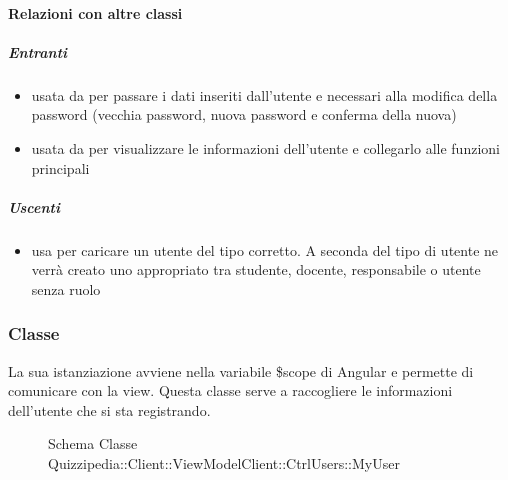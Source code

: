 \paragraph{Relazioni con altre classi}
\subparagraph{Entranti}
\begin{itemize}
\item usata da  per passare i dati inseriti dall'utente e necessari alla modifica della password (vecchia password, nuova password e conferma della nuova)
\item usata da  per visualizzare le informazioni dell'utente e collegarlo alle funzioni principali
\end{itemize}
\subparagraph{Uscenti}
\begin{itemize}
\item usa  per caricare un utente del tipo corretto. A seconda del tipo di utente ne verrà creato uno appropriato tra studente, docente, responsabile o utente senza ruolo
\end{itemize}
\subsubsection{Classe }
La sua istanziazione avviene nella variabile \$scope di Angular e permette di comunicare con la view. Questa classe serve a raccogliere le informazioni dell'utente che si sta registrando.
\begin{figure}[H]
\centering
\noindent{}
\caption[Schema Classe MyUser]{Schema Classe Quizzipedia::Client::ViewModelClient::CtrlUsers::MyUser}
\end{figure}
